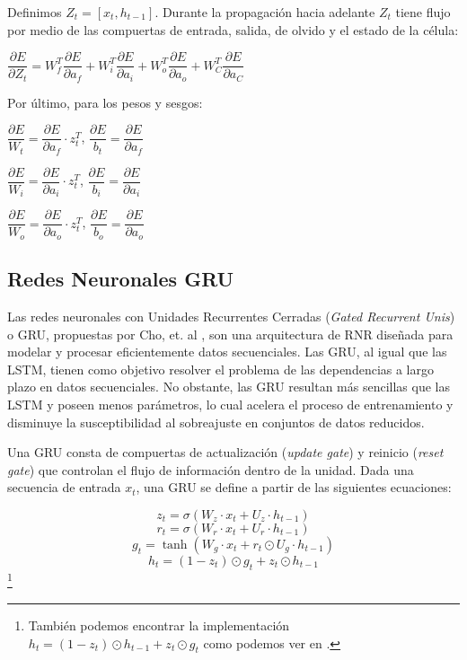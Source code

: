 Definimos $Z_t = [x_t, h_{t-1}]$. Durante la propagación hacia adelante $Z_t$ tiene flujo por medio de las compuertas de entrada, salida, de olvido y el estado de la célula:

\begin{center}
    $\dfrac{\partial E}{\partial Z_t} = W_f^T\dfrac{\partial E}{\partial a_f} + W_i^T\dfrac{\partial E}{\partial a_i} + W_o^T\dfrac{\partial E}{\partial a_o} + W_C^T\dfrac{\partial E}{\partial a_C}$
\end{center}

Por último, para los pesos y sesgos:

\begin{center}
    $\dfrac{\partial E}{W_t} = \dfrac{\partial E}{\partial a_f} \cdot z_t^T$, 
    $\dfrac{\partial E}{b_t} = \dfrac{\partial E}{\partial a_f}$

    $\dfrac{\partial E}{W_i} = \dfrac{\partial E}{\partial a_i} \cdot z_t^T$, 
    $\dfrac{\partial E}{b_i} = \dfrac{\partial E}{\partial a_i}$

    $\dfrac{\partial E}{W_o} = \dfrac{\partial E}{\partial a_o} \cdot z_t^T$, 
    $\dfrac{\partial E}{b_o} = \dfrac{\partial E}{\partial a_o}$
\end{center}

\subsection{Redes Neuronales GRU}

Las redes neuronales con Unidades Recurrentes Cerradas (\textit{Gated Recurrent Unis}) o GRU, propuestas por Cho, et. al \cite{GRU}, son una arquitectura de RNR diseñada para modelar y procesar eficientemente datos secuenciales. Las GRU, al igual que las LSTM, tienen como objetivo resolver el problema de las dependencias a largo plazo en datos secuenciales. No obstante, las GRU resultan más sencillas que las LSTM y poseen menos parámetros, lo cual acelera el proceso de entrenamiento y disminuye la susceptibilidad al sobreajuste en conjuntos de datos reducidos.

Una GRU consta de compuertas de actualización (\textit{update gate}) y reinicio (\textit{reset gate}) que controlan el flujo de información dentro de la unidad. Dada una secuencia de entrada $x_t$, una GRU se define a partir de las siguientes ecuaciones:

\[ z_t = \sigma(W_z \cdot x_t + U_z \cdot h_{t-1}) \]
\[ r_t = \sigma(W_r \cdot x_t + U_r \cdot h_{t-1}) \]
\[ g_t = \tanh(W_g \cdot x_t + r_t \odot U_g \cdot h_{t-1}) \]
\[ h_t = (1 - z_t) \odot g_t + z_t \odot h_{t-1} \] \footnote{También podemos encontrar la implementación $h_t = (1 - z_t) \odot h_{t-1} + z_t \odot g_t$ como podemos ver en \cite{GRU_units_in_R_Fichou}. }

